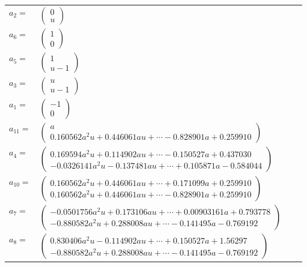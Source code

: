 \documentclass[1p]{elsarticle_modified}
\theoremstyle{definition}
\begin{document}
\begin{tabular}{m{7pt} m{180pt} m{7pt} m{180pt} }
\flushright $a_{2}=$&$\begin{pmatrix}0\\u\end{pmatrix}$ \\
\flushright $a_{6}=$&$\begin{pmatrix}1\\0\end{pmatrix}$ \\
\flushright $a_{5}=$&$\begin{pmatrix}1\\u-1\end{pmatrix}$ \\
\flushright $a_{3}=$&$\begin{pmatrix}u\\u-1\end{pmatrix}$ \\
\flushright $a_{1}=$&$\begin{pmatrix}-1\\0\end{pmatrix}$ \\
\flushright $a_{11}=$&$\begin{pmatrix}a\\0.160562 a^{2} u+0.446061 a u+\cdots-0.828901 a+0.259910\end{pmatrix}$ \\
\flushright $a_{4}=$&$\begin{pmatrix}0.169594 a^{2} u+0.114902 a u+\cdots-0.150527 a+0.437030\\-0.0326141 a^{2} u-0.137481 a u+\cdots+0.105871 a-0.584044\end{pmatrix}$ \\
\flushright $a_{10}=$&$\begin{pmatrix}0.160562 a^{2} u+0.446061 a u+\cdots+0.171099 a+0.259910\\0.160562 a^{2} u+0.446061 a u+\cdots-0.828901 a+0.259910\end{pmatrix}$ \\
\flushright $a_{7}=$&$\begin{pmatrix}-0.0501756 a^{2} u+0.173106 a u+\cdots+0.00903161 a+0.793778\\-0.880582 a^{2} u+0.288008 a u+\cdots-0.141495 a-0.769192\end{pmatrix}$ \\
\flushright $a_{8}=$&$\begin{pmatrix}0.830406 a^{2} u-0.114902 a u+\cdots+0.150527 a+1.56297\\-0.880582 a^{2} u+0.288008 a u+\cdots-0.141495 a-0.769192\end{pmatrix}$ \\

\end{tabular}
\end{document}
